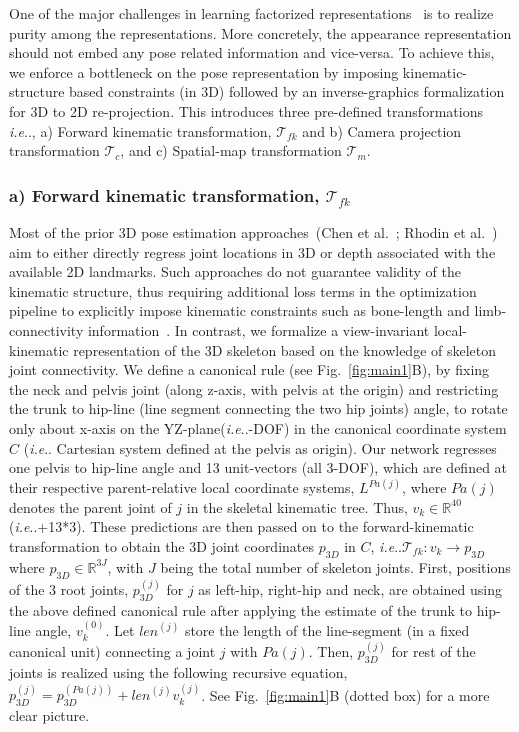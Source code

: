 \documentclass[letterpaper]{article} \usepackage{aaai20}  \usepackage{times}  \usepackage{helvet}  \usepackage{courier}  \usepackage{url}  \usepackage{graphicx}  \usepackage{amsmath}
\makeatletter
\DeclareRobustCommand\onedot{\futurelet\@let@token\@onedot}
\def\@onedot{\ifx\@let@token.\else.\null\fi\xspace}
\def\ie{\emph{i.e}\onedot} \def\Ie{\emph{I.e}\onedot}
\makeatother
\begin{document}
One of the major challenges in learning factorized representations~\cite{denton2017unsupervised} is to realize purity among the representations. More concretely, the appearance representation should not embed any pose related information and vice-versa. To achieve this, we enforce a bottleneck on the pose representation by imposing kinematic-structure based constraints (in 3D) followed by an inverse-graphics formalization for 3D to 2D re-projection. This introduces three pre-defined transformations \ie, a) Forward kinematic transformation, $\mathcal{T}_{fk}$ and b) Camera projection transformation $\mathcal{T}_c$, and c) Spatial-map transformation $\mathcal{T}_m$. 

\subsubsection{a) Forward kinematic transformation, $\mathcal{T}_{fk}$} Most of the prior 3D pose estimation approaches~({\color{coolblack}Chen et al.~\citeyear{chen2019unsupervised}}; {\color{coolblack}Rhodin et al.~\citeyear{rhodin2018unsupervised}}) aim to either directly regress joint locations in 3D or depth associated with the available 2D landmarks. Such approaches do not guarantee validity of the kinematic structure, thus requiring additional loss terms in the optimization pipeline to explicitly impose kinematic constraints such as bone-length and limb-connectivity information~\cite{habibie2019wild}. In contrast, we formalize a view-invariant local-kinematic representation of the 3D skeleton based on the knowledge of skeleton joint connectivity. 
We define a canonical rule (see Fig.~\ref{fig:main1}B), by fixing the neck and pelvis joint (along z-axis, with pelvis at the origin) and restricting the {trunk to hip-line (line segment connecting the two hip joints) angle}, to rotate only about x-axis on the YZ-plane(\ie 1-DOF) in the canonical coordinate system $C$ (\ie Cartesian system defined at the pelvis as origin). Our network regresses one pelvis to hip-line angle and 13 unit-vectors (all 3-DOF), which are defined at their respective parent-relative local coordinate systems, $L^{Pa(j)}$, where $Pa(j)$ denotes the parent joint of $j$ in the skeletal kinematic tree. Thus, $v_k\in \mathbb{R}^{40}$ (\ie 1+13*3). These predictions are then passed on to the forward-kinematic transformation to obtain the 3D joint coordinates $p_{3D}$ in $C$, \ie $\mathcal{T}_{fk}:v_k\rightarrow p_{3D}$ where $p_{3D}\in \mathbb{R}^{3J}$, with $J$ being the total number of skeleton joints. First, positions of the 3 root joints, $p_{3D}^{(j)}$ for $j$ as left-hip, right-hip and neck, are obtained using the above defined canonical rule after applying the estimate of the {trunk to hip-line angle}, $v_k^{(0)}$.
Let $\textit{len}^{(j)}$ store the length of the line-segment (in a fixed canonical unit) connecting a joint $j$ with $Pa(j)$. Then, $p_{3D}^{(j)}$ for rest of the joints is realized using the following recursive equation, $p_{3D}^{(j)} = p_{3D}^{(Pa(j))}+\textit{len}^{(j)}v_k^{(j)}$. See Fig.~\ref{fig:main1}B (dotted box) for a more clear picture.
\end{document}
